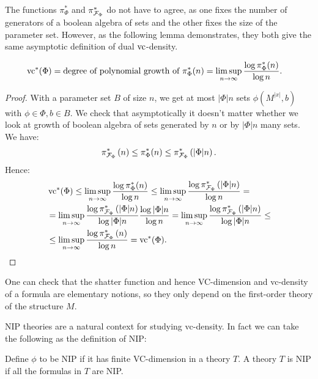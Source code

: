The functions $\pi^*_{\Phi}$ and $\pi^*_{\mathcal F_\Phi}$ do not have to agree,
as one fixes the number of generators of a boolean algebra of sets and the other fixes the size of the parameter set.
However, as the following lemma demonstrates, they both give the same asymptotic definition of dual $\operatorname{vc}$-density.

\begin{Lemma} \label{count_types}
  \begin{align*}
    \operatorname{vc}^*(\Phi) &= \text{degree of polynomial growth of $\pi^*_\Phi(n)$}  = \limsup_{n \to \infty}\frac{\log \pi^*_\Phi(n)}{\log n}.
  \end{align*}  
\end{Lemma}

\begin{proof}
  With a parameter set $B$ of size $n$, we get at most $|\Phi|n$ sets $\phi(M^{|x|}, b)$ with $\phi \in \Phi, b \in B$.
  We check that asymptotically it doesn't matter whether we look at growth of boolean algebra of sets generated by
  $n$ or by $|\Phi|n$ many sets.
  We have:
  \begin{align*}
    \pi^*_{\mathcal F_\Phi}\left(n\right) \leq \pi^*_\Phi(n) \leq \pi^*_{\mathcal F_\Phi}\left(|\Phi|n\right).
  \end{align*}
  Hence:
  \begin{align*}
    &\operatorname{vc}^*(\Phi) \leq \limsup_{n \to \infty}\frac{\log \pi^*_\Phi(n)}{\log n} \leq \limsup_{n \to \infty}\frac{\log \pi^*_{\mathcal F_\Phi}\left(|\Phi|n\right)}{\log n} = \\
    & = \limsup_{n \to \infty}\frac{\log \pi^*_{\mathcal F_\Phi}\left(|\Phi|n\right)}{\log |\Phi|n} \frac{\log |\Phi|n}{\log n} =
      \limsup_{n \to \infty}\frac{\log \pi^*_{\mathcal F_\Phi}\left(|\Phi|n\right)}{\log |\Phi|n} \leq \\
    &\leq \limsup_{n \to \infty}\frac{\log \pi^*_{\mathcal F_\Phi}\left(n\right)}{\log n} = \operatorname{vc}^*(\Phi).
  \end{align*}
\end{proof} 

One can check that the shatter function and hence VC-dimension and vc-density of a formula are elementary notions,
so they only depend on the first-order theory of the structure $M$.

NIP theories are a natural context for studying vc-density.
In fact we can take the following as the definition of NIP:
\begin{Definition}
  Define $\phi$ to be NIP if it has finite VC-dimension in a theory $T$.
  A theory $T$ is NIP if all the formulas in $T$ are NIP.
\end{Definition}


